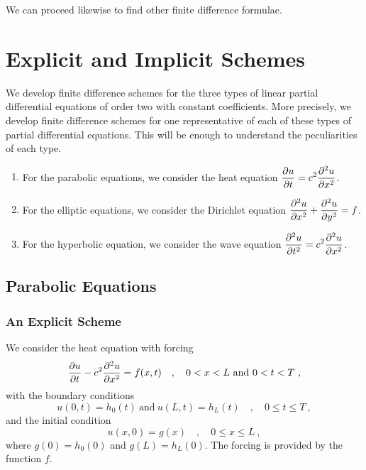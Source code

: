 We can proceed likewise to find other finite difference formulae.

\section{Explicit and Implicit Schemes}\label{EXplImplSchenes}

We develop finite difference schemes for the three types of linear
partial differential equations of order two with constant
coefficients.  More precisely, we develop finite difference schemes
for one representative of each of these types of partial differential
equations. This will be enough to understand the peculiarities of each
type.

\begin{enumerate}
\item For the parabolic equations, we consider the heat equation
$\displaystyle \frac{\partial{u}}{\partial{t}} = c^2 \frac{\partial^{2}{u}}{\partial{x}^{2}}$.
\item For the elliptic equations, we consider the Dirichlet equation
$\displaystyle \frac{\partial^{2}{u}}{\partial{x}^{2}} + \frac{\partial^{2}{u}}{\partial{y}^{2}} = f$.
\item For the hyperbolic equation, we consider the wave equation
$\displaystyle \frac{\partial^{2}{u}}{\partial{t}^{2}} = c^2 \frac{\partial^{2}{u}}{\partial{x}^{2}}$.
\end{enumerate}

\subsection{Parabolic Equations}

\subsubsection{An Explicit Scheme}

We consider the heat equation with forcing
\begin{equation} \label{HeatEqu}
\frac{\partial{u}}{\partial{t}} - c^2 \frac{\partial^{2}{u}}{\partial{x}^{2}} = f(x,t) \quad , \quad 0 < x < L \
\text{and} \ 0<t<T \ ,
\end{equation}
with the boundary conditions
\begin{equation} \label{HeatEquBC}
u(0,t)=h_0(t) \ \text{and} \ u(L,t)=h_L(t) \quad , \quad 0\leq t \leq T \ ,
\end{equation}
and the initial condition
\begin{equation} \label{HeatEquIC}
u(x,0) = g(x) \quad , \quad 0 \leq x \leq L \ ,
\end{equation}
where $g(0)=h_0(0)$ and $g(L)=h_L(0)$.  The forcing is provided by the
function $f$.

